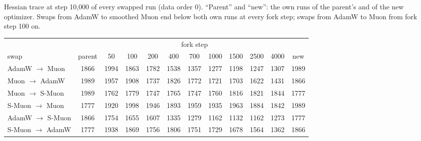 \begin{center}\small
\captionsetup{type=table}
\caption{Hessian trace at step 10{,}000 of every swapped run (data order 0). ``Parent'' and ``new'': the own runs of
the parent's and of the new optimizer. Swaps from AdamW to smoothed Muon end below both own runs at every fork step; swaps from
AdamW to Muon from fork step 100 on.}
\label{tab:app-swaptrace}
\footnotesize\setlength{\tabcolsep}{4pt}
\begin{tabular}{@{}l|c|ccccccccc|c@{}}
 & & \multicolumn{9}{c|}{fork step} & \\
swap & parent & 50 & 100 & 200 & 400 & 700 & 1000 & 1500 & 2500 & 4000 & new \\
\hline
AdamW $\to$ Muon & 1866 & 1994 & 1863 & 1782 & 1538 & 1357 & 1277 & 1198 & 1247 & 1307 & 1989 \\
Muon $\to$ AdamW & 1989 & 1957 & 1908 & 1737 & 1826 & 1772 & 1721 & 1703 & 1622 & 1431 & 1866 \\
Muon $\to$ S-Muon & 1989 & 1762 & 1779 & 1747 & 1765 & 1747 & 1760 & 1816 & 1821 & 1844 & 1777 \\
S-Muon $\to$ Muon & 1777 & 1920 & 1998 & 1946 & 1893 & 1959 & 1935 & 1963 & 1884 & 1842 & 1989 \\
AdamW $\to$ S-Muon & 1866 & 1754 & 1655 & 1607 & 1335 & 1279 & 1162 & 1132 & 1162 & 1273 & 1777 \\
S-Muon $\to$ AdamW & 1777 & 1938 & 1869 & 1756 & 1806 & 1751 & 1729 & 1678 & 1564 & 1362 & 1866 \\
\hline
\end{tabular}
\end{center}
